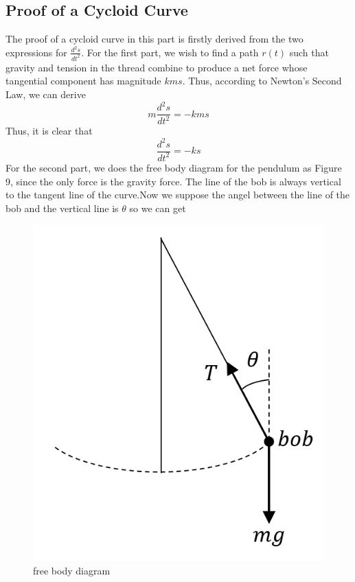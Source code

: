 \documentclass[12pt,a4paper]{article}
\begin{document}
\subsection{Proof of a Cycloid Curve}
The proof of a cycloid curve in this part is firstly derived from the two expressions for $\frac{d^2s}{dt^2}$. For the first part, we wish to find a path $r(t)$ such that gravity and tension in the thread combine to produce a net force whose tangential component has magnitude $kms$. Thus, according to Newton's Second Law, we can derive
$$m\frac{d^2s}{dt^2} = -kms$$
Thus, it is clear that
\begin{equation}
    \frac{d^2s}{dt^2} = -ks
\end{equation}
For the second part, we does the free body diagram for the pendulum as Figure 9, since the only force is the gravity force. The line of the bob is always vertical to the tangent line of the curve.Now we suppose the angel between the line of the bob and the vertical line is $\theta$ so we can get
\begin{figure}[!htbp]
    \centering
    \includegraphics[scale=0.35]{1.png}
    \caption{free body diagram}
    \label{force}
\end{figure}
\end{document}
